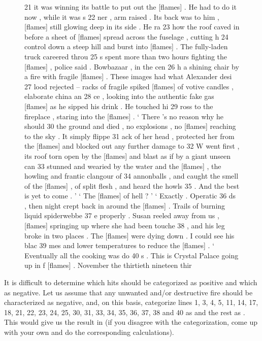 \begin{figure}
\begin{fitverb}
21 it was winning its battle to put out the [flames] . He had to do it now , while it was s
22 ner , arm raised . Its back was to him , [flames] still glowing deep in its side . He ra
23  how the roof caved in before a sheet of [flames] spread across the fuselage , cutting h
24 control down a steep hill and burst into [flames] . The fully-laden truck careered throu
25 s spent more than two hours fighting the [flames] , police said . Bowbazaar , in the cen
26 h a shining chair by a fire with fragile [flames] . These images had what Alexander desi
27 lood rejected -- racks of fragile spiked [flames] of votive candles , elaborate china an
28 ce , looking into the authentic fake gas [flames] as he sipped his drink . He touched hi
29 ross to the fireplace , staring into the [flames] . ` There 's no reason why he should
30 the ground and died , no explosions , no [flames] reaching to the sky . It simply flippe
31 ack of her head , protected her from the [flames] and blocked out any further damage to
32 W went first , its roof torn open by the [flames] and blast as if by a giant unseen can
33 stunned and wearied by the water and the [flames] , the howling and frantic clangour of
34 annonballs , and caught the smell of the [flames] , of split flesh , and heard the howls
35  . And the best is yet to come . ' ` The [flames] of hell ? ' ` Exactly . Operatic
36 ds , then night crept back in around the [flames] . Trails of burning liquid spiderwebbe
37 e properly . Susan reeled away from us , [flames] springing up where she had been touche
38  , and his leg broke in two places . The [flames] were dying down . I could see his blac
39 mes and lower temperatures to reduce the [flames] . ` Eventually all the cooking was do
40 s . This is Crystal Palace going up in f [flames] . November the thirtieth nineteen thir
\end{fitverb}
\hrulefill
\end{figure}

It is difficult to determine which hits should be categorized  as positive and which as negative. Let us assume that any unwanted and\slash or destructive fire should be characterized as negative, and, on this basis, categorize lines 1, 3, 4, 5, 11, 14, 17, 18, 21, 22, 23, 24, 25, 30, 31, 33, 34, 35, 36, 37, 38 and 40 as  and the rest as . This would give us the result in  (if you disagree with the categorization,  come up with your own and do the corresponding calculations).


